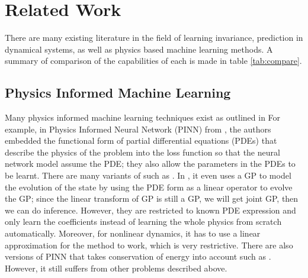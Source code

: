 \documentclass{statsmsc}
\begin{document}
\section{Related Work}
There are many existing literature in the field of learning invariance, prediction in dynamical systems, as well as physics based machine learning methods.
A summary of comparison of the capabilities of each is made in table \ref{tab:compare}.

\subsection{Physics Informed Machine Learning}
Many physics informed machine learning techniques exist as outlined in \cite{Cuomo2022, PIML}
For example, in Physics Informed Neural Network (PINN) from \cite{Raissi2019}, the authors embedded the functional form of partial differential equations (PDEs) that describe the physics of the problem into the loss function so that the neural network model assume the PDE; they also allow the parameters in the PDEs to be learnt. 
There are many variants of such as \cite{Qian2020}.
In \cite{Raissi2018}, it even uses a GP to model the evolution of the state by using the PDE form as a linear operator to evolve the GP; since the linear transform of GP is still a GP, we will get joint GP, then we can do inference.
However, they are restricted to known PDE expression and only learn the coefficients instead of learning the whole physics from scratch automatically. 
Moreover, for nonlinear dynamics, it has to use a linear approximation for the method to work, which is very restrictive.
There are also versions of PINN that takes conservation of energy into account such as \cite{Jagtap2020}.
However, it still suffers from other problems described above.
\end{document}
